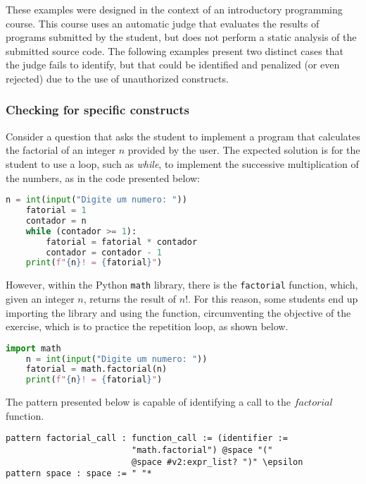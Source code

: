 These examples were designed in the context of an introductory programming course.
This course uses an automatic judge that evaluates the results of programs
submitted by the student, but does not perform a static analysis of the submitted
source code. The following examples present two distinct cases that the judge
fails to identify, but that could be identified and penalized (or even rejected) due
to the use of unauthorized constructs.

\subsubsection{Checking for specific constructs}

Consider a question that asks the student to implement a program that
calculates the factorial of an integer \(n\) provided by the user.
The expected solution is for the student to use a loop, such as \textit{while},
to implement the successive multiplication of the numbers, as in the code
presented below:

\begin{lstlisting}[language=Python]
    n = int(input("Digite um numero: "))
    fatorial = 1
    contador = n
    while (contador >= 1):
        fatorial = fatorial * contador
        contador = contador - 1
    print(f"{n}! = {fatorial}")
\end{lstlisting}

However, within the Python \texttt{math} library, there is the \texttt{factorial}
function, which, given an integer \(n\), returns the result of \(n!\).
For this reason, some students end up importing the library and using the
function, circumventing the objective of the exercise, which is to practice the 
repetition loop, as shown below.

\begin{lstlisting}[language=Python]
    import math
    n = int(input("Digite um numero: "))
    fatorial = math.factorial(n)
    print(f"{n}! = {fatorial}")
\end{lstlisting}


The pattern presented below is capable of identifying a call to the 
\(factorial\) function.

\begin{verbatim}
pattern factorial_call : function_call := (identifier :=
                         "math.factorial") @space "("
                         @space #v2:expr_list? ")" \epsilon
pattern space : space := " "*
\end{verbatim}


